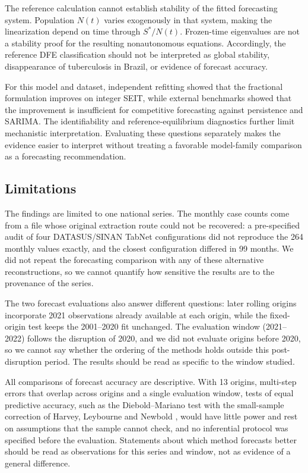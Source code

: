\documentclass[pdflatex,sn-mathphys-ay,lineno]{sn-jnl}
\begin{document}
The reference calculation cannot establish stability of the fitted forecasting system. Population $N(t)$ varies exogenously in that system, making the linearization depend on time through $S^*/N(t)$. Frozen-time eigenvalues are not a stability proof for the resulting nonautonomous equations. Accordingly, the reference DFE classification should not be interpreted as global stability, disappearance of tuberculosis in Brazil, or evidence of forecast accuracy.

For this model and dataset, independent refitting showed that the fractional formulation improves on integer SEIT, while external benchmarks showed that the improvement is insufficient for competitive forecasting against persistence and SARIMA. The identifiability and reference-equilibrium diagnostics further limit mechanistic interpretation. Evaluating these questions separately makes the evidence easier to interpret without treating a favorable model-family comparison as a forecasting recommendation.

\subsection{Limitations}

The findings are limited to one national series. The monthly case counts come from a file whose original extraction route could not be recovered: a pre-specified audit of four DATASUS/SINAN TabNet configurations did not reproduce the 264 monthly values exactly, and the closest configuration differed in 99 months. We did not repeat the forecasting comparison with any of these alternative reconstructions, so we cannot quantify how sensitive the results are to the provenance of the series.

The two forecast evaluations also answer different questions: later rolling origins incorporate 2021 observations already available at each origin, while the fixed-origin test keeps the 2001--2020 fit unchanged. The evaluation window (2021--2022) follows the disruption of 2020, and we did not evaluate origins before 2020, so we cannot say whether the ordering of the methods holds outside this post-disruption period. The results should be read as specific to the window studied.

All comparisons of forecast accuracy are descriptive. With 13 origins, multi-step errors that overlap across origins and a single evaluation window, tests of equal predictive accuracy, such as the Diebold--Mariano test \citep{diebold1995} with the small-sample correction of Harvey, Leybourne and Newbold \citep{harvey1997}, would have little power and rest on assumptions that the sample cannot check, and no inferential protocol was specified before the evaluation. Statements about which method forecasts better should be read as observations for this series and window, not as evidence of a general difference.
\end{document}
